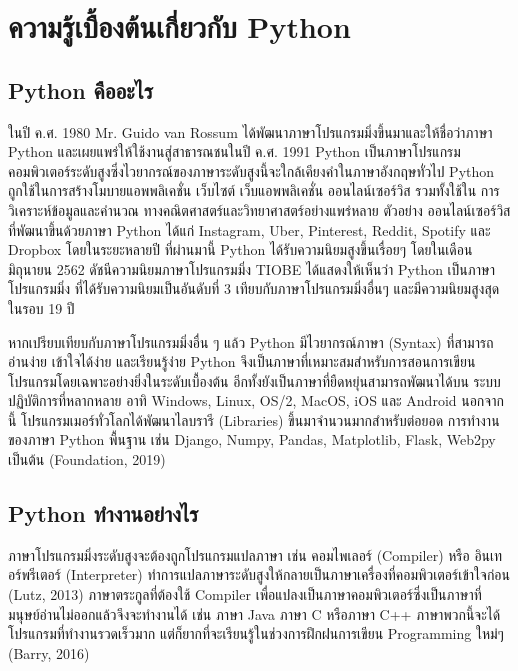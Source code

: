 \chapter{ความรู้เบื้องต้นเกี่ยวกับ Python}

\section{Python คืออะไร}

ในปี ค.ศ. 1980 Mr. Guido van Rossum ได้พัฒนาภาษาโปรแกรมมิ่งขึ้นมาและให้ชื่อว่าภาษา Python และเผยแพร่ให้ใช้งานสู่สาธารณชนในปี ค.ศ. 1991 \cite{Gui19} Python เป็นภาษาโปรแกรมคอมพิวเตอร์ระดับสูงซึ่งไวยากรณ์ของภาษาระดับสูงนี้จะใกล้เคียงคำในภาษาอังกฤษทั่วไป \cite{All15}  Python ถูกใช้ในการสร้างโมบายแอพพลิเคชั่น เว็บไซต์ เว็บแอพพลิเคชั่น ออนไลน์เซอร์วิส รวมทั้งใช้ใน การวิเคราะห์ข้อมูลและคำนวณ ทางคณิตศาสตร์และวิทยาศาสตร์อย่างแพร่หลาย  ตัวอย่าง ออนไลน์เซอร์วิสที่พัฒนาขึ้นด้วยภาษา Python ได้แก่ Instagram, Uber, Pinterest, Reddit, Spotify และ Dropbox \cite{Shu19} โดยในระยะหลายปี ที่ผ่านมานี้ Python ได้รับความนิยมสูงขึ้นเรื่อยๆ โดยในเดือนมิถุนายน 2562 ดัชนีความนิยมภาษาโปรแกรมมิ่ง TIOBE ได้แสดงให้เห็นว่า Python เป็นภาษาโปรแกรมมิ่ง ที่ได้รับความนิยมเป็นอันดับที่ 3 เทียบกับภาษาโปรแกรมมิ่งอื่นๆ และมีความนิยมสูงสุดในรอบ 19 ปี \cite{TIO19}  

หากเปรียบเทียบกับภาษาโปรแกรมมิ่งอื่น ๆ แล้ว Python มีไวยากรณ์ภาษา (Syntax) ที่สามารถอ่านง่าย เข้าใจได้ง่าย และเรียนรู้ง่าย Python จึงเป็นภาษาที่เหมาะสมสำหรับการสอนการเขียนโปรแกรมโดยเฉพาะอย่างยิ่งในระดับเบื้องต้น อีกทั้งยังเป็นภาษาที่ยืดหยุ่นสามารถพัฒนาได้บน ระบบปฏิบัติการที่หลากหลาย อาทิ  Windows, Linux, OS/2, MacOS, iOS และ Android นอกจากนี้ โปรแกรมเมอร์ทั่วโลกได้พัฒนาไลบรารี (Libraries) ขึ้นมาจำนวนมากสำหรับต่อยอด การทำงานของภาษา Python พื้นฐาน เช่น Django, Numpy, Pandas, Matplotlib, Flask, Web2py เป็นต้น (Foundation, 2019)

\section{Python ทำงานอย่างไร}

ภาษาโปรแกรมมิ่งระดับสูงจะต้องถูกโปรแกรมแปลภาษา เช่น คอมไพเลอร์ (Compiler) หรือ อินเทอร์พรีเตอร์ (Interpreter) ทำการแปลภาษาระดับสูงให้กลายเป็นภาษาเครื่องที่คอมพิวเตอร์เข้าใจก่อน (Lutz, 2013) ภาษาตระกูลที่ต้องใช้ Compiler เพื่อแปลงเป็นภาษาคอมพิวเตอร์ซึ่งเป็นภาษาที่มนุษย์อ่านไม่ออกแล้วจึงจะทำงานได้ เช่น ภาษา Java ภาษา C หรือภาษา C++ ภาษาพวกนี้จะได้โปรแกรมที่ทำงานรวดเร็วมาก แต่ก็ยากที่จะเรียนรู้ในช่วงการฝึกฝนการเขียน Programming ใหม่ๆ (Barry, 2016)


